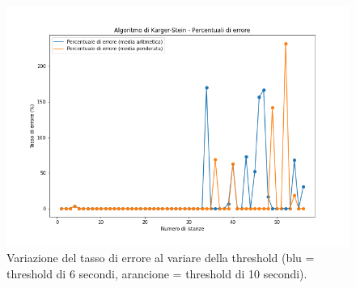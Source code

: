 \begin{figure}[H]
	\centering
	\includegraphics[width=1\textwidth]{res/images/single/karger-stein/tasso-di-errore/karger_stein_tassi_di_errore.png}
	\caption{Variazione del tasso di errore al variare della threshold
	(blu = threshold di 6 secondi, arancione = threshold di 10 secondi).}
	\label{fig:karger_stein_tassi_di_errore}
\end{figure}

